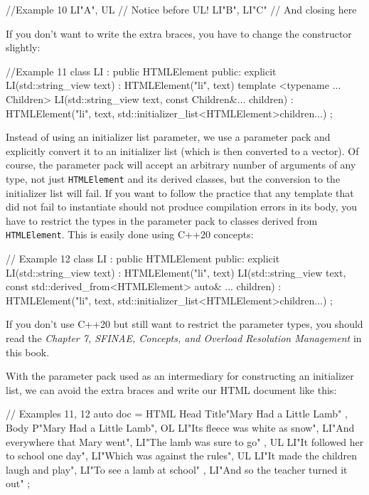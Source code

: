 \begin{code}
//Example 10
LI{"A",
  {UL{        // Notice { before UL!
    LI{"B"},
    LI{"C"}
  }}            // And closing } here
}
\end{code}

If you don't want to write the extra braces, you have to change the constructor slightly:

\begin{code}
//Example 11
class LI : public HTMLElement {
  public:
  explicit LI(std::string_view text) :
    HTMLElement("li", text) {}
  template <typename ... Children>
  LI(std::string_view text, const Children&... children) :
    HTMLElement("li", text,
           std::initializer_list<HTMLElement>{children...})
  {}
};
\end{code}

Instead of using an initializer list parameter, we use a parameter pack and explicitly convert it to an initializer list (which is then converted to a vector). Of course, the parameter pack will accept an arbitrary number of arguments of any type, not just \texttt{HTMLElement} and its derived classes, but the conversion to the initializer list will fail. If you want to follow the practice that any template that did not fail to instantiate should not produce compilation errors in its body, you have to restrict the types in the parameter pack to classes derived from \texttt{HTMLElement}. This is easily done using C++20 concepts:

\begin{code}
// Example 12
class LI : public HTMLElement {
  public:
  explicit LI(std::string_view text) :
    HTMLElement("li", text) {}
  LI(std::string_view text,
     const std::derived_from<HTMLElement>
     auto& ... children) :
    HTMLElement("li", text,
           std::initializer_list<HTMLElement>{children...})
  {}
};
\end{code}

If you don't use C++20 but still want to restrict the parameter types, you should read the \emph{Chapter 7, SFINAE, Concepts, and Overload Resolution Management} in this book.

With the parameter pack used as an intermediary for constructing an initializer list, we can avoid the extra braces and write our HTML document like this:

\begin{code}
// Examples 11, 12
auto doc = HTML{
  Head{
    Title{"Mary Had a Little Lamb"}
  },
  Body{
    P{"Mary Had a Little Lamb"},
    OL{
      LI{"Its fleece was white as snow"},
      LI{"And everywhere that Mary went"},
      LI{"The lamb was sure to go"}
    },
    UL{
      LI{"It followed her to school one day"},
      LI{"Which was against the rules",
        UL{
          LI{"It made the children laugh and play"},
          LI{"To see a lamb at school"}
        }
      },
      LI{"And so the teacher turned it out"}
    }
  }
};
\end{code}

